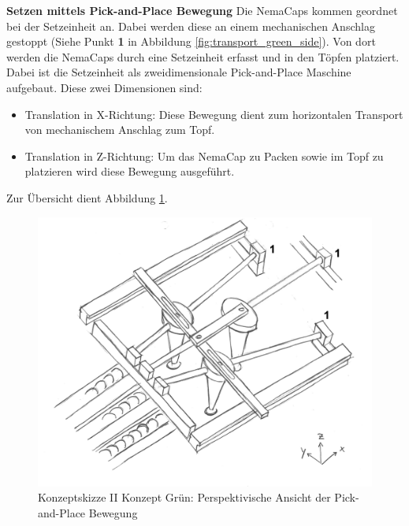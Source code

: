 \textbf{Setzen mittels Pick-and-Place Bewegung}
\newline
Die NemaCaps kommen geordnet bei der Setzeinheit an. Dabei werden diese an einem mechanischen Anschlag gestoppt (Siehe Punkt \textbf{1} in Abbildung \ref{fig:transport_green_side}). Von dort werden die NemaCaps durch eine Setzeinheit erfasst und in den Töpfen platziert. Dabei ist die Setzeinheit als zweidimensionale Pick-and-Place Maschine aufgebaut. Diese zwei Dimensionen sind:
\begin{itemize}
	\item Translation in X-Richtung: Diese Bewegung dient zum horizontalen Transport von mechanischem Anschlag zum Topf.
	\item Translation in Z-Richtung: Um das NemaCap zu Packen sowie im Topf zu platzieren wird diese Bewegung ausgeführt.
\end{itemize}
Zur Übersicht dient Abbildung \ref{fig:transport_green_pers}. 
\begin{figure}[H]
	\includegraphics[scale=0.6]{Illustrationen/5-Konzept/green_2Dmachine_pervsp.jpg}
	\caption{Konzeptskizze II Konzept Grün: Perspektivische Ansicht der Pick-and-Place Bewegung}
	\label{fig:transport_green_pers}
\end{figure}

